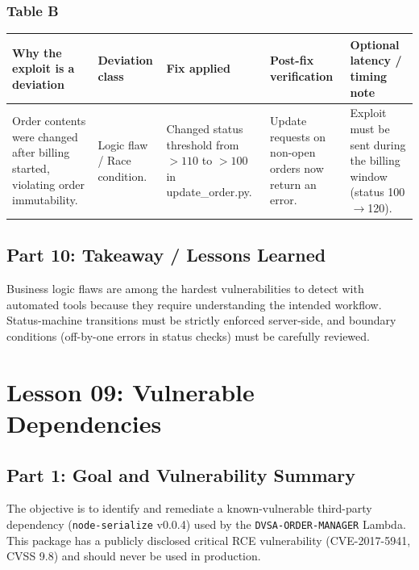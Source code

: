 \documentclass[12pt]{report}
\begin{document}
\subsection*{Table B}
\begin{table}[H]
  \footnotesize
  \centering
  \begin{tabularx}{\textwidth}{|Y|Y|Y|Y|Y|}
    \hline
    \textbf{Why the exploit is a deviation} & \textbf{Deviation class} & \textbf{Fix applied} & \textbf{Post-fix verification} & \textbf{Optional latency / timing note} \\
    \hline
    Order contents were changed after billing started, violating order immutability. &
    Logic flaw / Race condition. &
    Changed status threshold from $>110$ to $>100$ in update\_order.py. &
    Update requests on non-open orders now return an error. &
    Exploit must be sent during the billing window (status 100$\rightarrow$120). \\
    \hline
  \end{tabularx}
\end{table}

\section{Part 10: Takeaway / Lessons Learned}
Business logic flaws are among the hardest vulnerabilities to detect with automated tools because they require understanding the intended workflow. Status-machine transitions must be strictly enforced server-side, and boundary conditions (off-by-one errors in status checks) must be carefully reviewed.

\clearpage

\chapter{Lesson 09: Vulnerable Dependencies}

\section{Part 1: Goal and Vulnerability Summary}
The objective is to identify and remediate a known-vulnerable third-party dependency (\texttt{node-serialize} v0.0.4) used by the \texttt{DVSA-ORDER-MANAGER} Lambda. This package has a publicly disclosed critical RCE vulnerability (CVE-2017-5941, CVSS 9.8) and should never be used in production.
\end{document}
